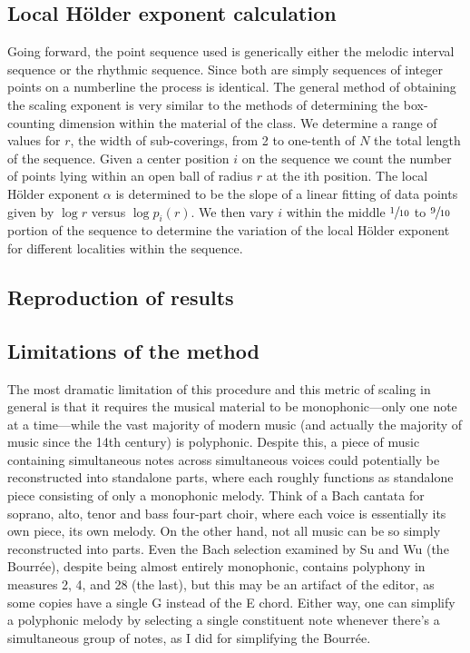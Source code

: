 \documentclass{article}
\begin{document}
\subsection{Local Hölder exponent calculation}

Going forward, the point sequence used is generically either the melodic
interval sequence or the rhythmic sequence. Since both are simply sequences of
integer points on a numberline the process is identical. The general method of
obtaining the scaling exponent is very similar to the methods of determining the
box-counting dimension within the material of the class. We determine a range of
values for $r$, the width of sub-coverings, from 2 to one-tenth of $N$ the total
length of the sequence. Given a center position $i$ on the sequence we count the
number of points lying within an open ball of radius $r$ at the ith position.
The local Hölder exponent $\alpha$ is determined to be the slope of a linear
fitting of data points given by  $\log r$ versus $\log p_i(r)$. We then vary $i$
within the middle $\sfrac{1}{10}$ to $\sfrac{9}{10}$ portion of the sequence to
determine the variation of the local Hölder exponent for different localities
within the sequence.

\subsection{Reproduction of results}

\subsection{Limitations of the method}

The most dramatic limitation of this procedure and this metric of scaling in
general is that it requires the musical material to be monophonic---only one
note at a time---while the vast majority of modern music (and actually the
majority of music since the 14th century) is polyphonic. Despite this, a piece
of music containing simultaneous notes across simultaneous voices could
potentially be reconstructed into standalone parts, where each roughly functions
as standalone piece consisting of only a monophonic melody. Think of a Bach
cantata for soprano, alto, tenor and bass four-part choir, where each voice is
essentially its own piece, its own melody. On the other hand, not all music can
be so simply reconstructed into parts. Even the Bach selection examined by Su
and Wu (the Bourrée), despite being almost entirely monophonic, contains
polyphony in measures 2, 4, and 28 (the last), but this may be an artifact of
the editor, as some copies have a single G instead of the E chord. Either way,
one can simplify a polyphonic melody by selecting a single constituent note
whenever there's a simultaneous group of notes, as I did for simplifying the
Bourrée.
\end{document}
